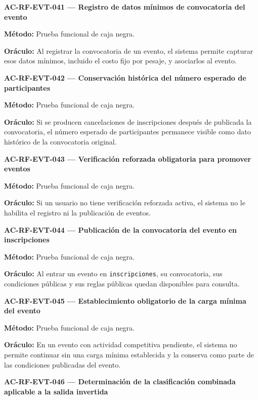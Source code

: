 \documentclass[10pt,letterpaper]{article}
\begin{document}
\noindent\textbf{AC-RF-EVT-041 --- Registro de datos mínimos de convocatoria del evento}\par
\textbf{Método:} Prueba funcional de caja negra.\par
\textbf{Oráculo:} Al registrar la convocatoria de un evento, el sistema permite capturar esos datos mínimos, incluido el costo fijo por pesaje, y asociarlos al evento.\par\vspace{0.45em}
\noindent\textbf{AC-RF-EVT-042 --- Conservación histórica del número esperado de participantes}\par
\textbf{Método:} Prueba funcional de caja negra.\par
\textbf{Oráculo:} Si se producen cancelaciones de inscripciones después de publicada la convocatoria, el número esperado de participantes permanece visible como dato histórico de la convocatoria original.\par\vspace{0.45em}
\noindent\textbf{AC-RF-EVT-043 --- Verificación reforzada obligatoria para promover eventos}\par
\textbf{Método:} Prueba funcional de caja negra.\par
\textbf{Oráculo:} Si un usuario no tiene verificación reforzada activa, el sistema no le habilita el registro ni la publicación de eventos.\par\vspace{0.45em}
\noindent\textbf{AC-RF-EVT-044 --- Publicación de la convocatoria del evento en inscripciones}\par
\textbf{Método:} Prueba funcional de caja negra.\par
\textbf{Oráculo:} Al entrar un evento en \texttt{inscripciones}, su convocatoria, sus condiciones públicas y sus reglas públicas quedan disponibles para consulta.\par\vspace{0.45em}
\noindent\textbf{AC-RF-EVT-045 --- Establecimiento obligatorio de la carga mínima del evento}\par
\textbf{Método:} Prueba funcional de caja negra.\par
\textbf{Oráculo:} En un evento con actividad competitiva pendiente, el sistema no permite continuar sin una carga mínima establecida y la conserva como parte de las condiciones publicadas del evento.\par\vspace{0.45em}
\noindent\textbf{AC-RF-EVT-046 --- Determinación de la clasificación combinada aplicable a la salida invertida}\par
\end{document}
